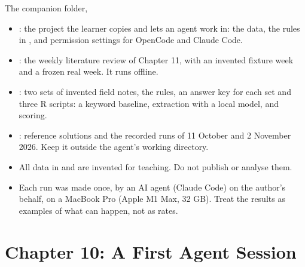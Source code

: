 \documentclass[11pt,aspectratio=169]{beamer}
\begin{document}
\begin{frame}{The companion folder, }
  \small
  \begin{itemize}
    \item {}: the project the learner copies and lets an agent work in: the data, the rules in , and permission settings for OpenCode and Claude Code.
    \item {}: the weekly literature review of Chapter 11, with an invented fixture week and a frozen real week. It runs offline.
    \item {}: two sets of invented field notes, the rules, an answer key for each set and three R scripts: a keyword baseline, extraction with a local model, and scoring.
    \item {}: reference solutions and the recorded runs of 11 October and 2 November 2026. Keep it outside the agent's working directory.
    \item All data in  and  are invented for teaching. Do not publish or analyse them.
    \item Each run was made once, by an AI agent (Claude Code) on the author's behalf, on a MacBook Pro (Apple M1 Max, 32 GB). Treat the results as examples of what can happen, not as rates.
  \end{itemize}
\end{frame}

\section{Chapter 10: A First Agent Session}
\end{document}
